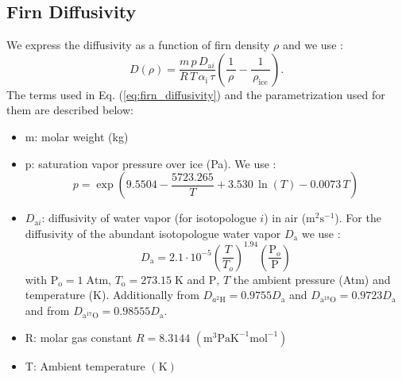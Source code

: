 \documentclass[11pt, draftcls, onecolumn]{IEEEtran} %
\numberwithin{equation}{section}
\numberwithin{table}{section}
\numberwithin{figure}{section}
\begin{document}
\begin{appendices}
	

\section{Firn Diffusivity} \label{sec:appendix_firn_diffusion}
	
We express the diffusivity as a function of firn density $\rho$ and we use \citep{Johnsen2000}:
\begin{equation}
D\!\left(\rho\right) = \frac{m\,p\,D_{\mathrm{a}i}}{R\,T\,\alpha_\mathrm{i}\,\tau}
\left(\frac{\,1\,}{\,\rho\,} - \frac{\,1\,}{\,\rho_{\mathrm{ice}}\,}\right).
\label{eq:firn_diffusivity}
\end{equation}
The terms used in Eq. (\ref{eq:firn_diffusivity}) and the parametrization used for them are described below:
\begin{itemize}

\item{m: molar weight  (kg)}

\item{p: saturation vapor pressure over ice (Pa). We use \citep{Murphy2006}:
\begin{equation}
p = \exp \left(9.5504 - \frac{5723.265}{T} + 3.530\,\ln\!\left( T \right) - 0.0073\,T \right)
\label{eq:sat_vap_pres}
\end{equation}}

\item{$D_{\mathrm{a}i}$:  diffusivity of water vapor (for isotopologue $i$) in air ($\mathrm{m}^2 \mathrm{s}^{-1}$). 
For the diffusivity of the abundant isotopologue water vapor $D_{\mathrm{a}}$ we use \citep{Hall1976}:
\begin{equation}
D_{\mathrm{a}} = 2.1\cdot 10^{-5} {\left(\frac{T}{T_o}\right)}^{1.94} \left(\frac{\mathrm{P}_o}{\mathrm{P}}\right) 
\label{eq:air_diffusivity}
\end{equation}
with $\mathrm{P}_{\mathrm{o}} = 1 \;\mathrm{Atm}$, $T_{\mathrm{o}} = 273.15 \;\mathrm{K}$  and $\mathrm{P}, \,T$ the ambient pressure (Atm) and temperature (K).
Additionally from \cite{MerlivatandJouzel} $D_{a^2\mathrm{H}} = 0.9755{D_{\mathrm{a}}}$ and 
$D_{\mathrm{a}^{18}\mathrm{O}} = 0.9723{D_{\mathrm{a}}}$ and from \cite{Barkan2007}
$D_{\mathrm{a}^{17}\mathrm{O}} = 0.98555{D_{\mathrm{a}}}$.}

\item{R: molar gas constant $R = 8.3144 \,\,(\mathrm{m}^3\mathrm{PaK}^{-1}\mathrm{mol}^{-1})$}

\item{T: Ambient temperature $(\mathrm{K})$}


\end{itemize}
\end{appendices}
\end{document}
